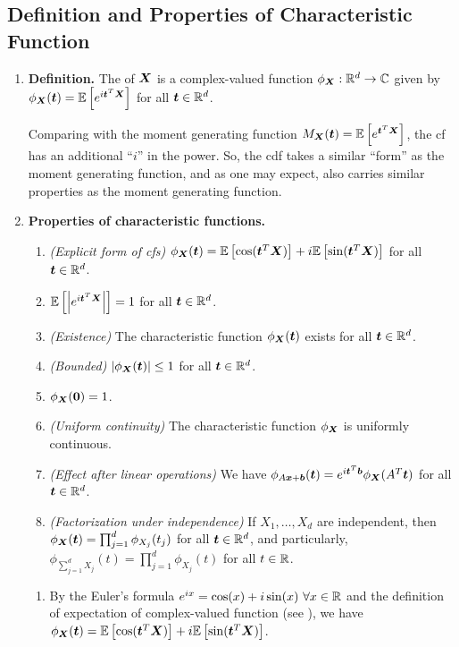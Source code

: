 \subsection{Definition and Properties of Characteristic Function}
\label{subsect:cf-def-prop}
\begin{enumerate}
\item \textbf{Definition.} The  of \(\bm{X}\)
is a complex-valued function \(\phi_{\bm{X}}:\mathbb{R}^{d}\to\mathbb{C}\) given by
\(\phi_{\bm{X}}(\bm{t})=\mathbb{E}\left[e^{i\bm{t}^{T}\bm{X}}\right]\) for all
\(\bm{t}\in\mathbb{R}^{d}\).

Comparing with the moment generating function \(M_{\bm{X}}(\bm{t})
=\mathbb{E}\left[e^{\bm{t}^{T}\bm{X}}\right]\), the cf has an additional ``\(i\)'' in the
power. So, the cdf takes a similar ``form'' as the moment generating function,
and as one may expect, also carries similar properties as the moment generating
function.
\item\label{it:cf-prop} \textbf{Properties of characteristic functions.}
\begin{enumerate}
\item \emph{(Explicit form of cfs)}
\(\phi_{\bm{X}}(\bm{t})=\mathbb{E}\left[\cos(\bm{t}^{T}\bm{X})\right]
+i\mathbb{E}\left[\sin(\bm{t}^{T}\bm{X})\right]\) for all \(\bm{t}\in\mathbb{R}^{d}\).
\item 
\(\mathbb{E}\left[\left|e^{i\bm{t}^{T}\bm{X}}\right|\right]=1\) for all
\(\bm{t}\in\mathbb{R}^{d}\).
\item \emph{(Existence)} The characteristic function
\(\phi_{\bm{X}}(\bm{t})\) exists for all \(\bm{t}\in\mathbb{R}^{d}\).
\item \emph{(Bounded)} \(|\phi_{\bm{X}}(\bm{t})|\le 1\) for all
\(\bm{t}\in\mathbb{R}^{d}\).
\item \(\phi_{\bm{X}}(\bm{0})=1\).
\item\label{it:cf-unif-cts} \emph{(Uniform continuity)} The characteristic function
\(\phi_{\bm{X}}\) is uniformly continuous.
\item \emph{(Effect after linear operations)}
We have \(\phi_{A\bm{x}+\bm{b}}(\bm{t})=e^{i\bm{t}^{T}\bm{b}}
\phi_{\bm{X}}(A^{T}\bm{t})\) for all \(\bm{t}\in\mathbb{R}^{d}\).
\item \emph{(Factorization under independence)} If \(X_1,\dotsc,X_d\) are
independent, then \(\phi_{\bm{X}}(\bm{t})=\prod_{j=1}^{d}\phi_{X_j}(t_j)\)
for all \(\bm{t}\in\mathbb{R}^{d}\), and particularly,
\(\phi_{\sum_{j=1}^{d}X_j}(t)=\prod_{j=1}^{d}\phi_{X_j}(t)\) for all \(t\in\mathbb{R}\).
\end{enumerate}
\begin{pf}
\begin{enumerate}
\item By the Euler's formula \(e^{ix}=\cos(x)+i\sin(x)~\forall x\in\mathbb{R}\) and
the definition of expectation of complex-valued function (see
), we have
\(\phi_{\bm{X}}(\bm{t})=\mathbb{E}\left[\cos(\bm{t}^{T}\bm{X})\right]
+i\mathbb{E}\left[\sin(\bm{t}^{T}\bm{X})\right]\).


\end{enumerate}
\end{pf}
\end{enumerate}
